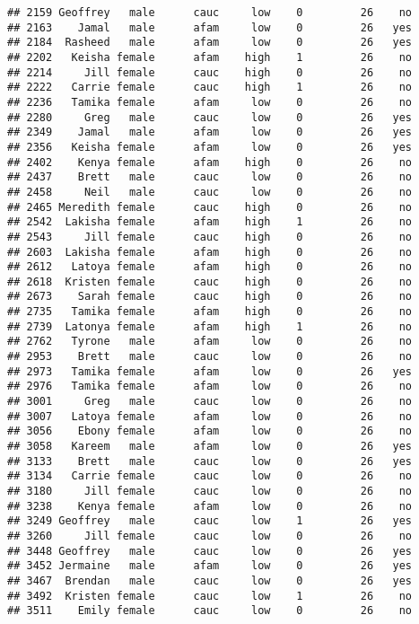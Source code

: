 \documentclass[
]{article}
\begin{document}
\begin{verbatim}
## 2159 Geoffrey   male      cauc     low    0         26    no
## 2163    Jamal   male      afam     low    0         26   yes
## 2184  Rasheed   male      afam     low    0         26   yes
## 2202   Keisha female      afam    high    1         26    no
## 2214     Jill female      cauc    high    0         26    no
## 2222   Carrie female      cauc    high    1         26    no
## 2236   Tamika female      afam     low    0         26    no
## 2280     Greg   male      cauc     low    0         26   yes
## 2349    Jamal   male      afam     low    0         26   yes
## 2356   Keisha female      afam     low    0         26   yes
## 2402    Kenya female      afam    high    0         26    no
## 2437    Brett   male      cauc     low    0         26    no
## 2458     Neil   male      cauc     low    0         26    no
## 2465 Meredith female      cauc    high    0         26    no
## 2542  Lakisha female      afam    high    1         26    no
## 2543     Jill female      cauc    high    0         26    no
## 2603  Lakisha female      afam    high    0         26    no
## 2612   Latoya female      afam    high    0         26    no
## 2618  Kristen female      cauc    high    0         26    no
## 2673    Sarah female      cauc    high    0         26    no
## 2735   Tamika female      afam    high    0         26    no
## 2739  Latonya female      afam    high    1         26    no
## 2762   Tyrone   male      afam     low    0         26    no
## 2953    Brett   male      cauc     low    0         26    no
## 2973   Tamika female      afam     low    0         26   yes
## 2976   Tamika female      afam     low    0         26    no
## 3001     Greg   male      cauc     low    0         26    no
## 3007   Latoya female      afam     low    0         26    no
## 3056    Ebony female      afam     low    0         26    no
## 3058   Kareem   male      afam     low    0         26   yes
## 3133    Brett   male      cauc     low    0         26   yes
## 3134   Carrie female      cauc     low    0         26    no
## 3180     Jill female      cauc     low    0         26    no
## 3238    Kenya female      afam     low    0         26    no
## 3249 Geoffrey   male      cauc     low    1         26   yes
## 3260     Jill female      cauc     low    0         26    no
## 3448 Geoffrey   male      cauc     low    0         26   yes
## 3452 Jermaine   male      afam     low    0         26   yes
## 3467  Brendan   male      cauc     low    0         26   yes
## 3492  Kristen female      cauc     low    1         26    no
## 3511    Emily female      cauc     low    0         26    no

\end{verbatim}
\end{document}
